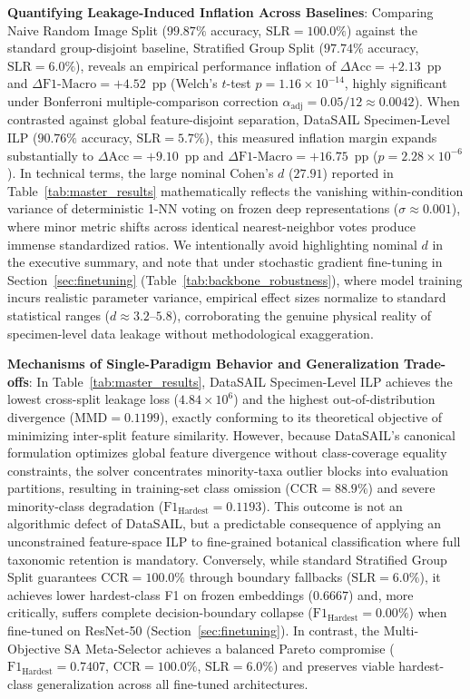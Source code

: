 \documentclass[a4paper,fleqn]{cas-sc}
\begin{document}
\textbf{Quantifying Leakage-Induced Inflation Across Baselines}: Comparing \textsf{Naive Random Image Split} ($99.87\%$ accuracy, $\mathrm{SLR}=100.0\%$) against the standard group-disjoint baseline, \textsf{Stratified Group Split} ($97.74\%$ accuracy, $\mathrm{SLR}=6.0\%$), reveals an empirical performance inflation of $\Delta\text{Acc} = +2.13$~pp and $\Delta\text{F1-Macro} = +4.52$~pp (Welch's $t$-test $p = 1.16 \times 10^{-14}$, highly significant under Bonferroni multiple-comparison correction $\alpha_{\text{adj}} = 0.05/12 \approx 0.0042$). When contrasted against global feature-disjoint separation, \textsf{DataSAIL Specimen-Level ILP} ($90.76\%$ accuracy, $\mathrm{SLR}=5.7\%$), this measured inflation margin expands substantially to $\Delta\text{Acc} = +9.10$~pp and $\Delta\text{F1-Macro} = +16.75$~pp ($p = 2.28 \times 10^{-6}$). In technical terms, the large nominal Cohen's $d$ ($27.91$) reported in Table~\ref{tab:master_results} mathematically reflects the vanishing within-condition variance of deterministic 1-NN voting on frozen deep representations ($\sigma \approx 0.001$), where minor metric shifts across identical nearest-neighbor votes produce immense standardized ratios. We intentionally avoid highlighting nominal $d$ in the executive summary, and note that under stochastic gradient fine-tuning in Section~\ref{sec:finetuning} (Table~\ref{tab:backbone_robustness}), where model training incurs realistic parameter variance, empirical effect sizes normalize to standard statistical ranges ($d \approx 3.2$--$5.8$), corroborating the genuine physical reality of specimen-level data leakage without methodological exaggeration.

\textbf{Mechanisms of Single-Paradigm Behavior and Generalization Trade-offs}: In Table~\ref{tab:master_results}, \textsf{DataSAIL Specimen-Level ILP} achieves the lowest cross-split leakage loss ($4.84 \times 10^6$) and the highest out-of-distribution divergence ($\mathrm{MMD} = 0.1199$), exactly conforming to its theoretical objective of minimizing inter-split feature similarity. However, because DataSAIL's canonical formulation optimizes global feature divergence without class-coverage equality constraints, the solver concentrates minority-taxa outlier blocks into evaluation partitions, resulting in training-set class omission ($\mathrm{CCR} = 88.9\%$) and severe minority-class degradation ($\mathrm{F1}_{\text{Hardest}} = 0.1193$). This outcome is not an algorithmic defect of DataSAIL, but a predictable consequence of applying an unconstrained feature-space ILP to fine-grained botanical classification where full taxonomic retention is mandatory. Conversely, while standard \textsf{Stratified Group Split} guarantees $\mathrm{CCR}=100.0\%$ through boundary fallbacks ($\mathrm{SLR} = 6.0\%$), it achieves lower hardest-class F1 on frozen embeddings ($0.6667$) and, more critically, suffers complete decision-boundary collapse ($\mathrm{F1}_{\text{Hardest}} = 0.00\%$) when fine-tuned on ResNet-50 (Section~\ref{sec:finetuning}). In contrast, the Multi-Objective SA Meta-Selector achieves a balanced Pareto compromise ($\mathrm{F1}_{\text{Hardest}} = 0.7407$, $\mathrm{CCR} = 100.0\%$, $\mathrm{SLR} = 6.0\%$) and preserves viable hardest-class generalization across all fine-tuned architectures.
\end{document}

